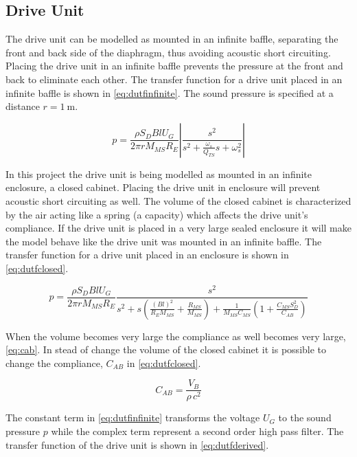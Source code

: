 \subsection{Drive Unit}
The drive unit can be modelled as mounted in an infinite baffle, separating the front and back side of the diaphragm, thus avoiding acoustic short circuiting. 
Placing the drive unit in an infinite baffle prevents the pressure at the front and back to eliminate each other. \cite[p.~44]{Elektroakustik}  
The transfer function for a drive unit placed in an infinite baffle is shown in \cref{eq:dutfinfinite}.
The sound pressure is specified at a distance $r=\SI{1}{\meter}$.  

\begin{equation}
p = \frac{\rho S_D B l U_G}{2\pi r M_{MS} R_E}\left|\frac{s^2}{s^2 + \frac{\omega_s}{Q_{TS}}s+\omega_s^2}\right|
\label{eq:dutfinfinite}
\end{equation}

In this project the drive unit is being modelled as mounted in an infinite enclosure, a closed cabinet.
Placing the drive unit in enclosure will prevent acoustic short circuiting as well. 
The volume of the closed cabinet is characterized by the air acting like a spring (a capacity) which affects the drive unit's compliance.  
If the drive unit is placed in a very large sealed enclosure it will make the model behave like the drive unit was mounted in an infinite baffle.  
The transfer function for a drive unit placed in an enclosure is shown in \cref{eq:dutfclosed}.

\begin{equation}
p = \frac{\rho S_D B l U_G}{2\pi r M_{MS} R_E}\frac{s^2}{s^2 +s \left(\frac{(Bl)^2}{R_EM_{MS}}+\frac{R_{MS}}{M_{MS}}\right)+\frac{1}{M_{MS}C_{MS}}\left(1+\frac{C_{MS}S_D^2}{C_{AB}}\right)}
\label{eq:dutfclosed}
\end{equation}

When the volume becomes very large the compliance as well becomes very large, \cref{eq:cab}. 
In stead of change the volume of the closed cabinet it is possible to change the compliance, $C_{AB}$ in \cref{eq:dutfclosed}. 

\begin{equation}
C_{AB} = \frac{V_B}{\rho \,c^2}
\label{eq:cab}
\end{equation} 

The constant term in \cref{eq:dutfinfinite} transforms the voltage $U_G$ to the sound pressure $p$ while the complex term represent a second order high pass filter.
The transfer function of the drive unit is shown in \cref{eq:dutfderived}.

